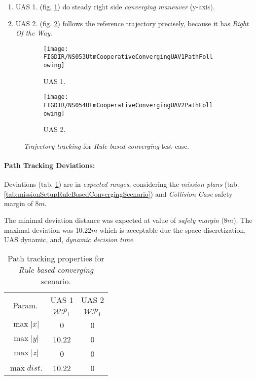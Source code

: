 \begin{enumerate}
    \item UAS 1. (fig, \ref{fig:ruleBasedConvergingUAS1PathTracking}) do steady right side \emph{converging maneuver} (y-axis).
    
    \item UAS 2. (fig. \ref{fig:ruleBasedCovnergingUAS2PathTracking}) follows the reference trajectory precisely, because it has \emph{Right Of the Way}.
\end{enumerate}

\begin{figure}[H]
    \centering
    \begin{subfigure}{0.48\textwidth}
    	\centering
        \texttt{[image: \\FIGDIR/NS053UtmCooperativeConvergingUAV1PathFollowing]}
        \caption{UAS 1.}
        \label{fig:ruleBasedConvergingUAS1PathTracking}
    \end{subfigure}
    \begin{subfigure}{0.48\textwidth}
    	\centering
        \texttt{[image: \\FIGDIR/NS054UtmCooperativeConvergingUAV2PathFollowing]} 
        \caption{UAS 2.}
        \label{fig:ruleBasedCovnergingUAS2PathTracking}
    \end{subfigure}
    \caption{\emph{Trajectory tracking} for \emph{Rule based converging} test case. }
    \label{fig:ruleBasedConvergingTrajectoryTrackingPerformance}
\end{figure}

\paragraph{Path Tracking Deviations:} Deviations (tab. \ref{tab:pathTrackingParametersForRuleBasedConverging}) are in \emph{expected ranges}, considering the \emph{mission plans} (tab. \ref{tab:missionSetupRuleBasedConvergingScenario}) and \emph{Collision Case} safety margin of $8 m$.

The minimal deviation distance was expected at value of \emph{safety margin} ($8 m$). The maximal deviation was $10.22m$ which is acceptable due the space discretization, UAS dynamic, and, \emph{dynamic decision time}.

\begin{table}[H]
    \centering
    \begin{tabular}{c||c|c}
        \multirow{2}{*}{Param.} & UAS 1     & UAS 2              \\\cline{2-3}
                        & $\mathscr{WP}_1$  & $\mathscr{WP}_1$   \\\hline\hline
          $\max |x|$    & 0                 & 0                  \\\hline
          $\max |y|$    & 10.22             & 0                  \\\hline
          $\max |z|$    & 0                 & 0                  \\\hline
          $\max dist.$  & 10.22             & 0                  \\
    \end{tabular}
    \caption{Path tracking properties for \emph{Rule based converging} scenario.}
    \label{tab:pathTrackingParametersForRuleBasedConverging}
\end{table}